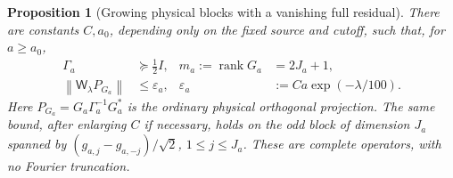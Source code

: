 \documentclass[11pt]{article}
\newtheorem{proposition}[theorem]{Proposition}
\theoremstyle{remark}
\newcommand{\norm}[1]{\left\lVert #1\right\rVert}
\begin{document}
\begin{proposition}[Growing physical blocks with a vanishing full residual]
\label{prop:v135-growing-radical}
There are constants $C,a_0$, depending only on the fixed source and
cutoff, such that, for $a\ge a_0$,
\begin{align}
 \Gamma_a&\succeq\tfrac12 I,
       &m_a:=\operatorname{rank}G_a&=2J_a+1,\label{eq:v135-gram}\\
 \norm{\mathsf W_\lambda P_{G_a}}
       &\le\varepsilon_a,
       &\varepsilon_a&:=Ca\exp(-\lambda/100).
       \label{eq:v135-block-residual}
\end{align}
Here $P_{G_a}=G_a\Gamma_a^{-1}G_a^*$ is the ordinary physical
orthogonal projection.  The same bound, after enlarging $C$ if
necessary, holds on the odd block of dimension $J_a$ spanned by
$(g_{a,j}-g_{a,-j})/\sqrt2$, $1\le j\le J_a$.
These are complete operators, with no Fourier truncation.
\end{proposition}
\end{document}
